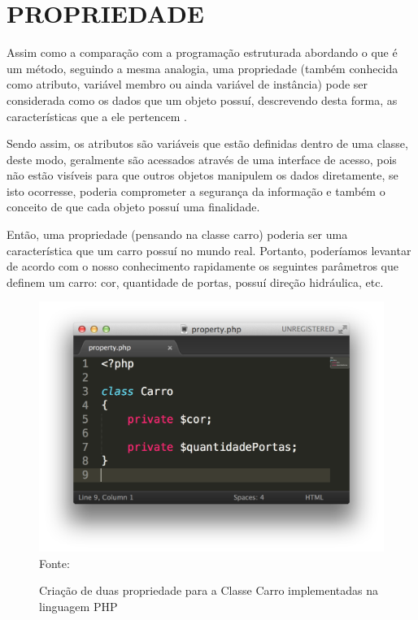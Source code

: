 \section{PROPRIEDADE}
Assim como a comparação com a programação estruturada abordando o que é um 
método, seguindo a mesma analogia, uma propriedade (também conhecida como 
atributo, variável membro ou ainda variável de instância) pode ser considerada 
como os dados que um objeto possuí, descrevendo desta forma, as características 
que a ele pertencem \cite{programmingPhp}.

Sendo assim, os atributos são variáveis que estão definidas dentro de uma
classe, deste modo, geralmente são acessados através de uma interface de acesso,
pois não estão visíveis para que outros objetos manipulem os dados diretamente, 
se isto ocorresse, poderia comprometer a segurança da informação e também o 
conceito de que cada objeto possuí uma finalidade.

Então, uma propriedade (pensando na classe carro) poderia ser uma característica
que um carro possuí no mundo real. Portanto, poderíamos levantar de acordo com 
o nosso conhecimento rapidamente os seguintes parâmetros que definem um carro: 
cor, quantidade de portas, possuí direção hidráulica, etc.

\begin{figure}[h!tb]
	\centering
	\caption{Criação de duas propriedade para a Classe Carro implementadas na
	linguagem PHP}
	\includegraphics[width=\textwidth]{images/property.png}
	\label{fig:propriedade}
	\centering
	\footnotesize Fonte: \fonteOAutor
\end{figure}

